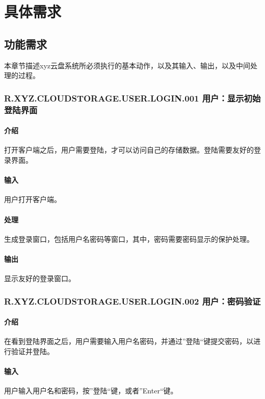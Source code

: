 \chapter{具体需求}
\section{功能需求}

本章节描述xyz云盘系统所必须执行的基本动作，以及其输入、输出，以及中间处理的过程。
\subsection{R.XYZ.CLOUDSTORAGE.USER.LOGIN.001 用户：显示初始登陆界面 }

\subsubsection{介绍}
打开客户端之后，用户需要登陆，才可以访问自己的存储数据。登陆需要友好的登录界面。

\subsubsection{输入}
用户打开客户端。

\subsubsection{处理}
生成登录窗口，包括用户名密码等窗口，其中，密码需要密码显示的保护处理。
\subsubsection{输出}
显示友好的登录窗口。

\subsection{R.XYZ.CLOUDSTORAGE.USER.LOGIN.002 用户：密码验证 }

\subsubsection{介绍}
在看到登陆界面之后，用户需要输入用户名密码，并通过”登陆“键提交密码，以进行验证并登陆。

\subsubsection{输入}
用户输入用户名和密码，按”登陆“键，或者”Enter“键。

